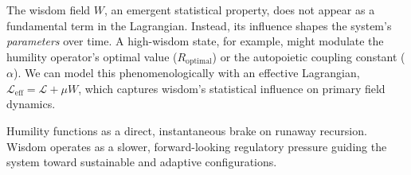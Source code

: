 The wisdom field \(W\), an emergent statistical property, does not appear as a fundamental term in the Lagrangian. Instead, its influence shapes the system's \textit{parameters} over time. A high-wisdom state, for example, might modulate the humility operator's optimal value (\(R_{\text{optimal}}\)) or the autopoietic coupling constant (\(\alpha\)). We can model this phenomenologically with an effective Lagrangian, \(\mathcal{L}_{\text{eff}} = \mathcal{L} + \mu W\), which captures wisdom's statistical influence on primary field dynamics.

Humility functions as a direct, instantaneous brake on runaway recursion. Wisdom operates as a slower, forward-looking regulatory pressure guiding the system toward sustainable and adaptive configurations.